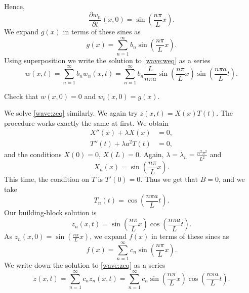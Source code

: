 Hence,
\begin{equation*}
\frac{\partial w_n}{\partial t}(x,0) =
\sin \left( \frac{n \pi}{L} x \right) .
\end{equation*}
We expand $g(x)$ in terms of these sines as
\begin{equation*}
g(x) =
\sum_{n=1}^\infty b_n \sin \left( \frac{n \pi}{L} x \right) .
\end{equation*}
Using superposition
we write the solution to \eqref{wave:weq} as a series
\begin{equation*}
w(x,t) =
\sum_{n=1}^\infty
b_n
w_n(x,t)
=
\sum_{n=1}^\infty
b_n
\frac{L}{n \pi a}
\sin \left( \frac{n \pi}{L} x \right)
\sin \left( \frac{n \pi a}{L} t \right) .
\end{equation*}

\begin{exercise}
Check that $w(x,0) = 0$ and
$w_t(x,0) = g(x)$.
\end{exercise}

We solve \eqref{wave:zeq} similarly.  We again try
$z(x,t) = X(x)T(t)$.  The procedure works exactly the same at first.
We obtain
\begin{align*}
X''(x) + \lambda X(x) &= 0 , \\
T''(t) + \lambda a^2 T(t) &= 0 ,
\end{align*}
and the conditions $X(0) = 0$, $X(L) = 0$.  Again,
$\lambda = \lambda_n = \frac{n^2 \pi^2}{L^2}$ and
\begin{equation*}
X_n(x) = \sin \left( \frac{n \pi}{L} x \right) .
\end{equation*}
This time,
the condition on $T$ is $T'(0) = 0$.  Thus 
we get that $B = 0$, and we take
\begin{equation*}
T_n(t) = \cos \left( \frac{n \pi a}{L} t \right).
\end{equation*}
Our building-block solution is
\begin{equation*}
z_n(x,t) = 
\sin \left( \frac{n \pi}{L} x \right)
\cos \left( \frac{n \pi a}{L} t \right) .
\end{equation*}
As $z_n(x,0) = \sin \left( \frac{n \pi}{L} x \right)$,
we expand $f(x)$ in terms of these sines as
\begin{equation*}
f(x) =
\sum_{n=1}^\infty c_n \sin \left( \frac{n \pi}{L} x \right) .
\end{equation*}
We
write down the solution to \eqref{wave:zeq} as a series
\begin{equation*}
z(x,t) =
\sum_{n=1}^\infty
c_n
z_n(x,t)
=
\sum_{n=1}^\infty
c_n
\sin \left( \frac{n \pi}{L} x \right)
\cos \left( \frac{n \pi a}{L} t \right) .
\end{equation*}

